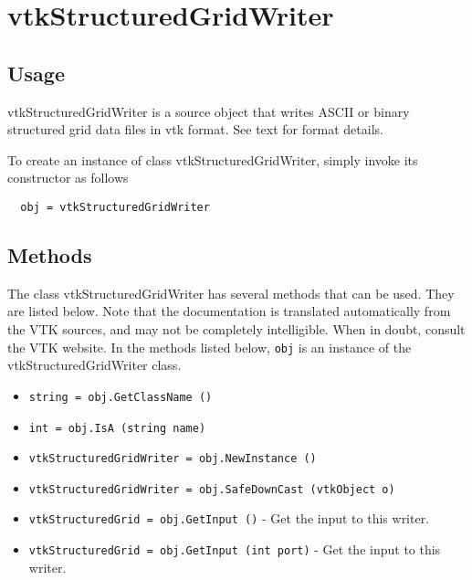 \section{vtkStructuredGridWriter}

\subsection{Usage}

 vtkStructuredGridWriter is a source object that writes ASCII or binary 
 structured grid data files in vtk format. See text for format details.

To create an instance of class vtkStructuredGridWriter, simply
invoke its constructor as follows
\begin{verbatim}
  obj = vtkStructuredGridWriter
\end{verbatim}
\subsection{Methods}

The class vtkStructuredGridWriter has several methods that can be used.
  They are listed below.
Note that the documentation is translated automatically from the VTK sources,
and may not be completely intelligible.  When in doubt, consult the VTK website.
In the methods listed below, \verb|obj| is an instance of the vtkStructuredGridWriter class.
\begin{itemize}
\item  \verb|string = obj.GetClassName ()|

\item  \verb|int = obj.IsA (string name)|

\item  \verb|vtkStructuredGridWriter = obj.NewInstance ()|

\item  \verb|vtkStructuredGridWriter = obj.SafeDownCast (vtkObject o)|

\item  \verb|vtkStructuredGrid = obj.GetInput ()| -  Get the input to this writer.

\item  \verb|vtkStructuredGrid = obj.GetInput (int port)| -  Get the input to this writer.

\end{itemize}

